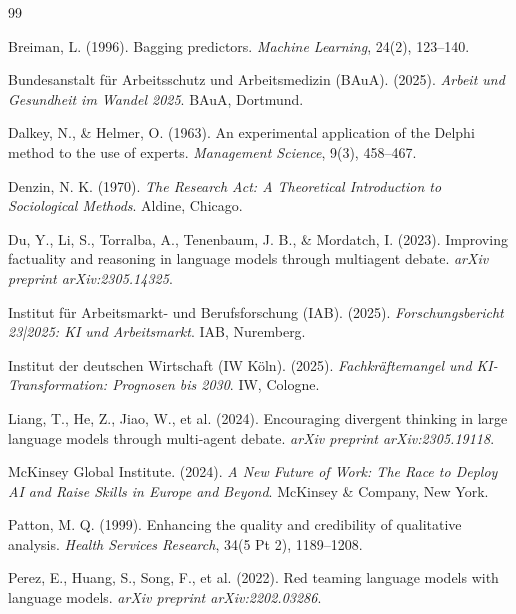 \documentclass[10pt,a4paper]{article}
\begin{document}
\begin{thebibliography}{99}

Breiman, L. (1996).
\newblock Bagging predictors.
\newblock \textit{Machine Learning}, 24(2), 123--140.

Bundesanstalt für Arbeitsschutz und Arbeitsmedizin (BAuA). (2025).
\newblock \textit{Arbeit und Gesundheit im Wandel 2025}.
\newblock BAuA, Dortmund.

Dalkey, N., \& Helmer, O. (1963).
\newblock An experimental application of the Delphi method to the use of experts.
\newblock \textit{Management Science}, 9(3), 458--467.

Denzin, N. K. (1970).
\newblock \textit{The Research Act: A Theoretical Introduction to Sociological Methods}.
\newblock Aldine, Chicago.

Du, Y., Li, S., Torralba, A., Tenenbaum, J. B., \& Mordatch, I. (2023).
\newblock Improving factuality and reasoning in language models through multiagent debate.
\newblock \textit{arXiv preprint arXiv:2305.14325}.

Institut für Arbeitsmarkt- und Berufsforschung (IAB). (2025).
\newblock \textit{Forschungsbericht 23|2025: KI und Arbeitsmarkt}.
\newblock IAB, Nuremberg.

Institut der deutschen Wirtschaft (IW Köln). (2025).
\newblock \textit{Fachkräftemangel und KI-Transformation: Prognosen bis 2030}.
\newblock IW, Cologne.

Liang, T., He, Z., Jiao, W., et al. (2024).
\newblock Encouraging divergent thinking in large language models through multi-agent debate.
\newblock \textit{arXiv preprint arXiv:2305.19118}.

McKinsey Global Institute. (2024).
\newblock \textit{A New Future of Work: The Race to Deploy AI and Raise Skills in Europe and Beyond}.
\newblock McKinsey \& Company, New York.

Patton, M. Q. (1999).
\newblock Enhancing the quality and credibility of qualitative analysis.
\newblock \textit{Health Services Research}, 34(5 Pt 2), 1189--1208.

Perez, E., Huang, S., Song, F., et al. (2022).
\newblock Red teaming language models with language models.
\newblock \textit{arXiv preprint arXiv:2202.03286}.


\end{thebibliography}
\end{document}
